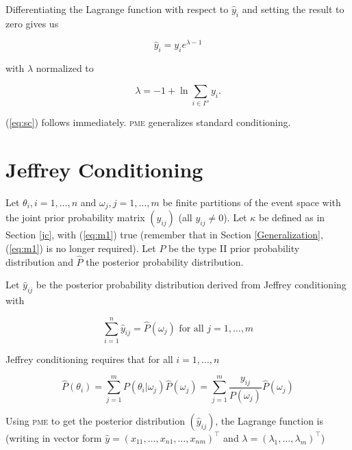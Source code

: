 {\noindent}Differentiating the Lagrange function with respect to $\hat{y}_{i}$ and
setting the result to zero gives us

\begin{equation}
  \label{eq:sc1}
  \hat{y}_{i}=y_{i}e^{\lambda-1}
\end{equation}

{\noindent}with $\lambda$ normalized to

\begin{equation}
  \label{eq:sc2}
  \lambda=-1+\ln{}\sum_{i\in{}I''}y_{i}.
\end{equation}

{\noindent}(\ref{eq:sc}) follows immediately. \textsc{pme} generalizes standard conditioning.

\section{Jeffrey Conditioning}
\label{jco}

Let $\theta_{i},i=1,\ldots,n$ and $\omega_{j},j=1,\ldots,m$ be finite
partitions of the event space with the joint prior probability matrix
$(y_{ij})$ (all $y_{ij}\neq{}0$). Let $\kappa$ be defined as in
Section \ref{jc}, with (\ref{eq:m1}) true (remember that in Section
\ref{Generalization}, (\ref{eq:m1}) is no longer required). Let $P$ be
the type II prior probability distribution and $\hat{P}$ the posterior
probability distribution.

Let $\hat{y}_{ij}$ be the posterior probability distribution derived
from Jeffrey conditioning with

\begin{equation}
  \label{eq:jc1}
  \sum_{i=1}^{n}\hat{y}_{ij}=\hat{P}(\omega_{j})\mbox{ for all }j=1,\ldots,m
\end{equation}

{\noindent}Jeffrey conditioning requires that for all $i=1,\ldots,n$

\begin{equation}
  \label{eq:jc2}
  \hat{P}(\theta_{i})=\sum_{j=1}^{m}P(\theta_{i}|\omega_{j})\hat{P}(\omega_{j})=\sum_{j=1}^{m}\frac{y_{ij}}{P(\omega_{j})}\hat{P}(\omega_{j})
\end{equation}

{\noindent}Using \textsc{pme} to get the posterior distribution
$(\hat{y}_{ij})$, the Lagrange function is (writing in vector form
$\hat{y}=(x_{11},\ldots,x_{n1},\ldots,x_{nm})^{\top}$ and
$\lambda=(\lambda_{1},\ldots,\lambda_{m})^{\top}$)

